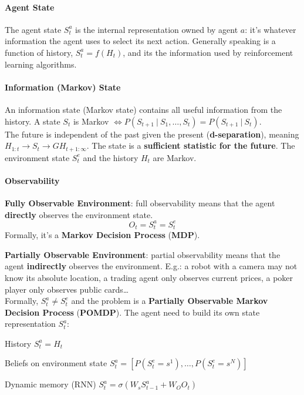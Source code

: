 \documentclass[10pt]{report}
\begin{document}
\paragraph{Agent State} The agent state $S_t^a$ is the internal representation owned by agent $a$: it's whatever information the agent uses to select its next action. Generally speaking is a function of history, $S_t^a = f(H_t)$, and its the information used by reinforcement learning algorithms.
\paragraph{Information (Markov) State} An information state (Markov state) contains all useful information from the history. A state $S_t$ is Markov $\Leftrightarrow P(S_{t+1}\:|\:S_1,\ldots,S_t) = P(S_{t+1}\:|\:S_t)$.\\
The future is independent of the past given the present (\textbf{d-separation}), meaning $H_{1:t}\rightarrow S_t \rightarrow GH_{t+1:\infty}$. The state is a \textbf{sufficient statistic for the future}. The environment state $S_t^e$ and the history $H_t$ are Markov.
\paragraph{Observability}
\begin{list}{}{}
	\item \textbf{Fully Observable Environment}: full observability means that the agent \textbf{directly} observes the environment state.
	$$O_t = S_t^a = S_t^e$$
	Formally, it's a \textbf{Markov Decision Process} (\textbf{MDP}).
	\item \textbf{Partially Observable Environment}: partial observability means that the agent \textbf{indirectly} observes the environment. E.g.: a robot with a camera may not know its absolute location, a trading agent only observes current prices, a poker player only observes public cards\ldots\\
	Formally, $S_t^a\neq S_t^e$ and the problem is a \textbf{Partially Observable Markov Decision Process} (\textbf{POMDP}). The agent need to build its own state representation $S_t^a$:
	\begin{list}{}{}
		\item History $S_t^a = H_t$
		\item Beliefs on environment state $S_t^a = [P(S_t^e=s^1),\ldots,P(S_t^e=s^N)]$
		\item Dynamic memory (RNN) $S_t^a = \sigma(W_sS_{t-1}^a + W_OO_t)$
	\end{list}
\end{list}
\end{document}
